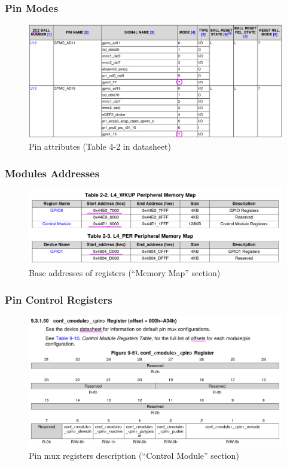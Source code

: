 \documentclass[aspectratio=169,usenames,dvipsnames]{beamer}
\begin{document}
\begin{frame}
  \frametitle{Pin Modes}
    \begin{figure}
      \centering
      \includegraphics[scale=0.4]{images/pin-modes.png}
      \caption{Pin attributes (Table 4-2 in datasheet)}
  \end{figure}
  \vspace*{-10mm}
\end{frame}

\begin{frame}
  \frametitle{Modules Addresses}
    \begin{figure}
      \centering
      \includegraphics[scale=0.3]{images/regs-base.png}
      \caption{Base addresses of registers (``Memory Map'' section)}
  \end{figure}
\end{frame}

\begin{frame}
  \frametitle{Pin Control Registers}
    \begin{figure}
      \centering
      \includegraphics[scale=0.3]{images/conf-reg.png}
      \caption{Pin mux registers description (``Control Module'' section)}
  \end{figure}
  \vspace*{-10mm}
\end{frame}
\end{document}
